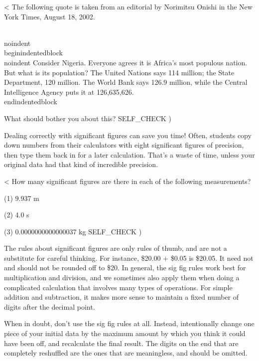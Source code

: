 <%
The following quote is taken from an editorial by
Norimitsu Onishi in the New York Times, August 18, 2002.

\\noindent \\begin{indentedblock}
\\noindent Consider Nigeria. Everyone agrees it is Africa's most
populous nation. But what is its population? The United
Nations says 114 million; the State Department, 120 million.
The World Bank says 126.9 million, while the Central
Intelligence Agency puts it at 126,635,626.
\\end{indentedblock}

\noindent What should bother you about this?
  SELF_CHECK
  ) %

Dealing correctly with significant figures can save you
time! Often, students copy down numbers from their
calculators with eight significant figures of precision,
then type them back in for a later calculation. That's a
waste of time, unless your original data had that kind of
incredible precision.

<%
How many significant figures are there in each of the
following measurements?

(1) 9.937 m

(2) 4.0 s

(3) 0.0000000000000037 kg
  SELF_CHECK
  ) %

The rules about significant figures are only rules of thumb,
and are not a substitute for careful thinking. For instance,
\$20.00 + \$0.05 is \$20.05. It need not and should not be
rounded off to \$20. In general, the sig fig rules work best
for multiplication and division, and we sometimes also apply them when
doing a complicated calculation that involves many types of
operations. For simple addition and subtraction, it makes
more sense to maintain a fixed number of digits after the decimal point.

When in doubt, don't use the sig fig rules at all. Instead,
intentionally change one piece of your initial data by the
maximum amount by which you think it could have been off,
and recalculate the final result. The digits on the end that
are completely reshuffled are the ones that are meaningless,
and should be omitted.

